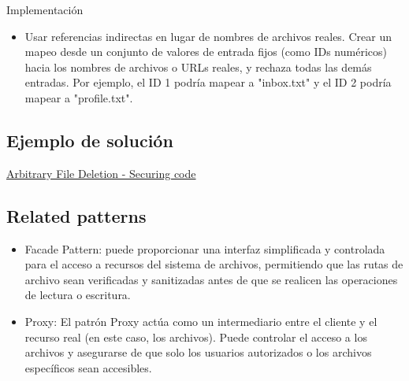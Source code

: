 Implementación
\begin{itemize}
    \item Usar referencias indirectas en lugar de nombres de archivos reales. Crear un mapeo desde un conjunto de valores de entrada fijos (como IDs numéricos) hacia los nombres de archivos o URLs reales, y rechaza todas las demás entradas. Por ejemplo, el ID 1 podría mapear a "inbox.txt" y el ID 2 podría mapear a "profile.txt". 
\end{itemize}

\subsection{Ejemplo de solución}
\href{https://patchstack.com/academy/wordpress/securing-code/arbitrary-file-deletion/}{Arbitrary File Deletion - Securing code}
\subsection{Related patterns}
\begin{itemize}
    \item Facade Pattern: puede proporcionar una interfaz simplificada y controlada para el acceso
    a recursos del sistema de archivos, permitiendo que las rutas de archivo sean verificadas
    y sanitizadas antes de que se realicen las operaciones de lectura o escritura.
    \item Proxy: El patrón Proxy actúa como un intermediario entre el cliente y el recurso real (en este caso, los archivos). Puede controlar el acceso a los archivos y asegurarse de que solo los usuarios autorizados o los archivos específicos sean accesibles.
\end{itemize}

